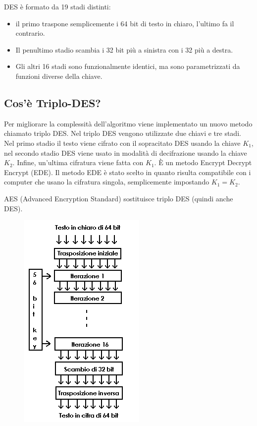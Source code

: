 DES è formato da 19 stadi distinti:
\begin{itemize}
\item	il primo traspone semplicemente i 64 bit di testo in chiaro, l'ultimo fa il contrario.
\item	Il penultimo stadio scambia i 32 bit più a sinistra con i 32 più a destra.
\item	Gli altri 16 stadi sono funzionalmente identici, ma sono parametrizzati da funzioni diverse della chiave.
\end{itemize}

\subsection{Cos'è Triplo-DES?}
Per migliorare la complessità dell'algoritmo viene implementato un nuovo metodo chiamato triplo DES. Nel triplo DES vengono utilizzate due chiavi e tre stadi. Nel primo stadio il testo viene cifrato con il sopracitato DES usando la chiave $K_1$, nel secondo stadio DES viene usato in modalità di decifrazione usando la chiave $K_2$. Infine, un'ultima cifratura viene fatta con $K_1$. È un metodo Encrypt Decrypt Encrypt (EDE). Il metodo EDE è stato scelto in quanto risulta compatibile con i computer che usano la cifratura singola, semplicemente impostando $K_1=K_2$.

AES (Advanced Encryption Standard) sostituisce triplo DES (quindi anche DES).

\begin{figure}[H]
\centering
\includegraphics[scale=0.8]{res/img/53_DES.png}
\end{figure}

